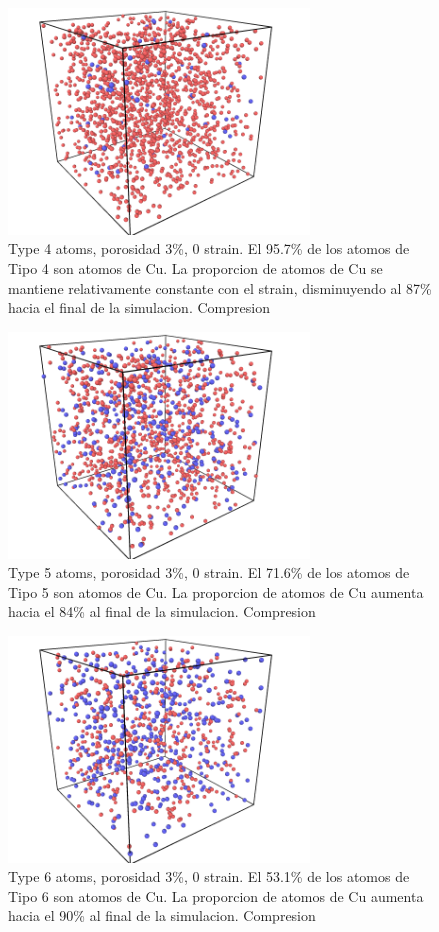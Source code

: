 \documentclass[10pt, oneside]{article} %
\begin{document}
\begin{figure}[H]
\centering
\includegraphics[width=8cm]{Figures/Porosidad_3_CU_tipo4.png}
\caption{Type 4 atoms, porosidad 3\%, 0 strain. El 95.7\% de los atomos de Tipo 4 son atomos de Cu. La proporcion de atomos de Cu se mantiene relativamente constante con el strain, disminuyendo al 87\% hacia el final de la simulacion. Compresion}
\end{figure}

\begin{figure}[H]
\centering
\includegraphics[width=8cm]{Figures/Porosidad_3_CU_tipo5.png}
\caption{Type 5 atoms, porosidad 3\%, 0 strain. El 71.6\% de los atomos de Tipo 5 son atomos de Cu. La proporcion de atomos de Cu  aumenta hacia el 84\% al final de la simulacion. Compresion}
\end{figure}

\begin{figure}[H]
\centering
\includegraphics[width=8cm]{Figures/Porosidad_3_CU_tipo6.png}
\caption{Type 6 atoms, porosidad 3\%, 0 strain. El 53.1\% de los atomos de Tipo 6 son atomos de Cu. La proporcion de atomos de Cu aumenta hacia el 90\% al final de la simulacion. Compresion}
\end{figure}
\end{document}
